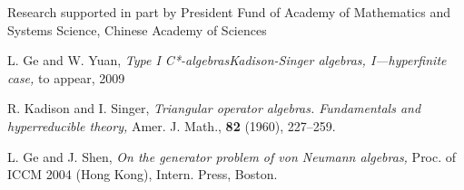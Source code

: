 \documentclass{pnastwo}
\begin{document}
\begin{article}



\begin{acknowledgments}
Research supported in part by President Fund of Academy of
Mathematics and Systems Science, Chinese Academy of Sciences
\end{acknowledgments}






\begin{thebibliography}{21}

 L. Ge and W. Yuan, {\em Type I C*-algebrasKadison-Singer algebras,
I---hyperfinite case,} to appear, 2009

 R. Kadison and I. Singer, {\em Triangular operator
algebras. Fundamentals and hyperreducible theory,} Amer. J. Math.,
{\bf 82 } (1960),  227--259.

  L. Ge and J. Shen, {\em On the generator problem of
von Neumann algebras,} Proc. of ICCM 2004 (Hong Kong), Intern.
Press, Boston.


\end{thebibliography}
\end{article}
\end{document}
